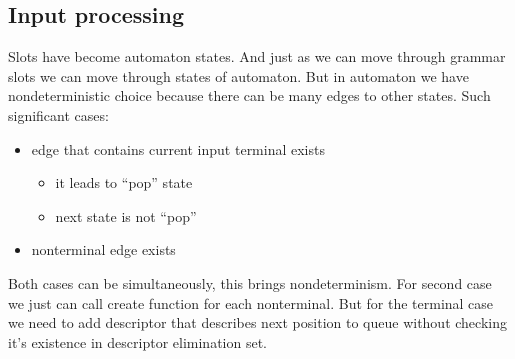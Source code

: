 \documentclass[runningheads,a4paper]{llncs}
\begin{document}


\subsection{Input processing}%

Slots have become automaton states. And just as we can move through grammar slots we can move through states 
of automaton. But in automaton we have nondeterministic choice because there can be many edges to other states.
Such significant cases:
\begin{itemize} 
\item edge that contains current input terminal exists
\begin{itemize} 
  \item it leads to ``pop'' state
  \item next state is not ``pop''
\end{itemize}
\item nonterminal edge exists 
\end{itemize}
Both cases can be simultaneously, this brings nondeterminism. For second case we just can call create function for each nonterminal. But for the terminal case we need to add descriptor that describes next position to queue without checking it's existence in descriptor elimination set.

\end{document}
